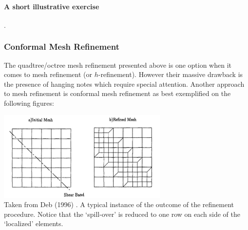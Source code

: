 \paragraph{A short illustrative exercise}.




\subsubsection{Conformal Mesh Refinement \label{ss:cmr}}

The quadtree/octree mesh refinement presented above is one option
when it comes to mesh refinement (or $h$-refinement). However their 
massive drawback is the presence of hanging notes which require 
special attention. 
Another approach to mesh refinement is conformal mesh refinement
as best exemplified on the following figures: 

\begin{center}
\includegraphics[height=4.5cm]{images/meshes/amrnew}\\
{\captionfont Taken from Deb \etal (1996) \cite{depl96}.
A typical instance of the outcome of the refinement procedure. 
Notice that the `spill-over' is reduced to one row on each side of the `localized' elements.}
\end{center}

